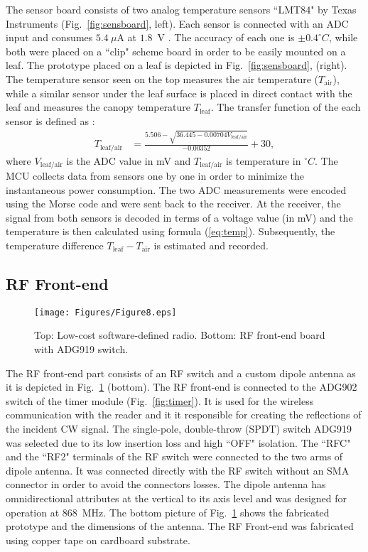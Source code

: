 \documentclass[journal]{IEEEtran}
\begin{document}
The sensor board consists of two  analog  temperature sensors ``LMT84" by Texas Instruments (Fig.~\ref{fig:sensboard}, left).
Each sensor is connected with an  ADC input  and consumes $5.4~\mu$A  at $1.8$~V  \cite{instrumentsLMT84}.
%
The accuracy of each one is $\pm 0.4^\circ C$, while both were placed on a ``clip" scheme board in order to be easily mounted on a leaf. 
%
The prototype placed on a leaf is depicted in  Fig.~\ref{fig:sensboard}, (right).
%
The temperature sensor seen on the top measures the air temperature ($T_\text{air}$), while a similar sensor under the leaf surface is placed in direct contact with the leaf and  measures the canopy temperature $T_\text{leaf}$. 
The transfer function of the each sensor is defined as \cite{instrumentsLMT84}:
\begin{align}
T_\text{leaf/air} &= \frac{5.506-\sqrt{36.445-0.00704V_\text{leaf/air}}} {-0.00352
}+30,
\label{eq:temp}
\end{align}
%
where $V_\text{leaf/air}$ is the ADC value in mV and $T_\text{leaf/air}$ is temperature in $^\circ C$. The MCU collects  data from sensors one by one in order to minimize the instantaneous power consumption. 
%
The two  ADC  measurements were encoded using the Morse code and were sent back to the receiver. 
%
At the receiver, the signal from both sensors is decoded in terms of a voltage value (in mV) and the temperature is then calculated using formula (\ref{eq:temp}). Subsequently, the temperature difference  $T_\text{leaf}-T_\text{air}$ is estimated and recorded.


\subsection{RF Front-end}
\label{subsec:watchdog}

\begin{figure}[t]
\centering
\texttt{[image: Figures/Figure8.eps]}
\caption{Top: Low-cost software-defined radio. Bottom: RF front-end board with ADG919 switch.}
\label{fig:rffront}
\end{figure}

The RF front-end part consists of an RF switch and a custom dipole antenna as it is depicted in Fig.~\ref{fig:rffront} (bottom).  
%
The RF front-end  is connected to the ADG902 switch of the timer module (Fig.~\ref{fig:timer}). 
%
It is used  for the wireless communication with the reader  and  it it responsible for creating the reflections of the incident CW signal.
%
The single-pole, double-throw  (SPDT) switch ADG919 \cite{ADG919} was selected due to its
low insertion loss  and high ``OFF" isolation. 
% 
The ``RFC"  and the  ``RF2" terminals of the RF switch were connected to the two arms of dipole antenna.
%
It was connected directly with the RF switch without  an SMA connector in order to avoid the connectors losses.  
%
The dipole antenna  has omnidirectional attributes at the vertical to its axis level and was designed for operation at $868$~MHz. 
%
The bottom picture of Fig.~\ref{fig:rffront} shows the fabricated prototype  and the dimensions of the antenna. 
%
The RF Front-end  was fabricated  using copper tape on cardboard substrate.
\end{document}
